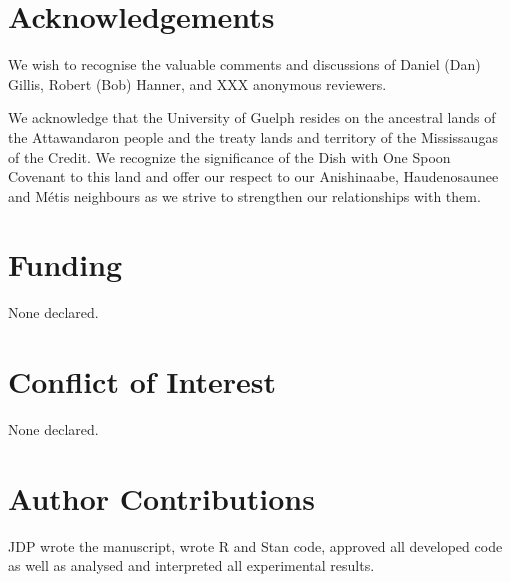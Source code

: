 \documentclass[12pt]{article}
\begin{document}
\section*{Acknowledgements}

We wish to recognise the valuable comments and discussions of Daniel (Dan) Gillis, Robert (Bob) Hanner, and XXX anonymous reviewers.

We acknowledge that the University of Guelph resides on the ancestral lands of the Attawandaron people and the treaty lands and territory of the Mississaugas of the Credit. We recognize the significance of the Dish with One Spoon Covenant to this land and offer our respect to our Anishinaabe, Haudenosaunee and M{\'e}tis neighbours as we strive to strengthen our relationships with them.

\section*{Funding}

None declared.

\section*{Conflict of Interest}

None declared.

\section*{Author Contributions}

JDP wrote the manuscript, wrote R and Stan code, approved all developed code as well as analysed and interpreted all experimental results. 



\end{document}
